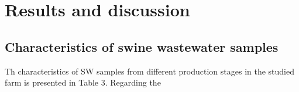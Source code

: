 \section{Results and discussion}
\subsection{Characteristics of swine wastewater samples}
Th characteristics of SW samples from different production stages in the studied farm is presented in Table 3. Regarding the 